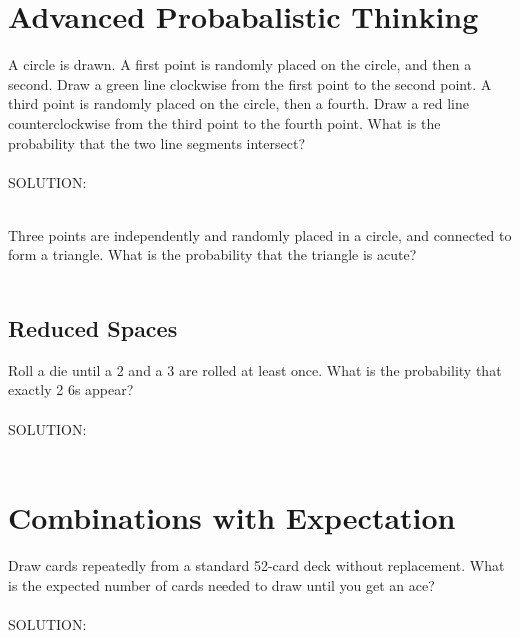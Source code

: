 \documentclass[12pt]{book}
\begin{document}
\section{Advanced Probabalistic Thinking}

\begin{propc}
    A circle is drawn. A first point is randomly placed on the circle, and then a second. Draw a green line clockwise from the first point to the second point. A third point is randomly placed on the circle, then a fourth. Draw a red line counterclockwise from the third point to the fourth point. What is the probability that the two line segments intersect? \\\\
    
    SOLUTION\@: \\\\
    
\end{propc}

\begin{propc}
Three points are independently and randomly placed in a circle, and connected to form a triangle. What is the probability that the triangle is acute? \\\\

\end{propc}


\subsection{Reduced Spaces}

\begin{propc}
Roll a die until a 2 and a 3 are rolled at least once. What is the probability that exactly 2 6s appear? \\\\
SOLUTION\@: \\\\
\end{propc}


\section{Combinations with Expectation}

\begin{propc}
    Draw cards repeatedly from a standard 52-card deck without replacement. What is the expected number of cards needed to draw until you get an ace? \\\\
    SOLUTION\@: \\\\
    
\end{propc}
\end{document}
